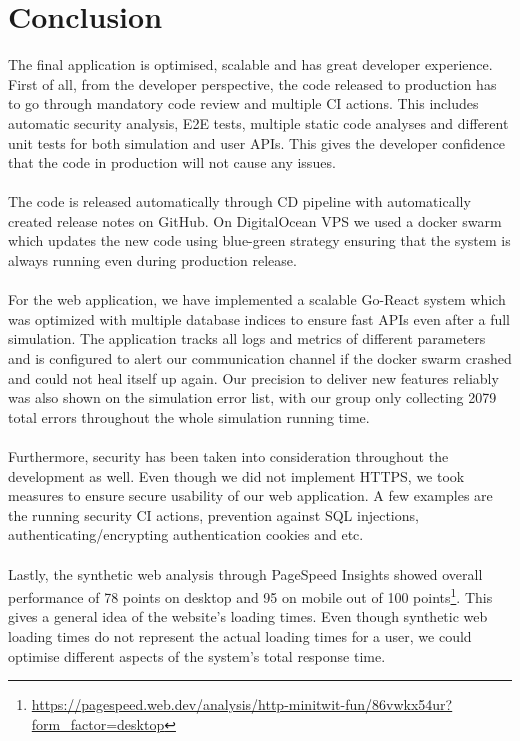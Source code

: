 \section{Conclusion}
The final application is optimised, scalable and has great developer experience. First of all, from the developer perspective, the code released to production  has to go through mandatory code review and multiple CI actions. This includes automatic security analysis, E2E tests, multiple static code analyses and different unit tests for both simulation and user APIs. This gives the developer confidence that the code in production will not cause any issues.
\\
\\
The code is released automatically through CD pipeline with automatically created release notes on GitHub. On DigitalOcean VPS we used a docker swarm which updates the new code using blue-green strategy ensuring that the system is always running even during production release.
\\
\\
For the web application, we have implemented a scalable Go-React system which was optimized with multiple database indices to ensure fast APIs even after a full simulation. The application tracks all logs and metrics of different parameters and is configured to alert our communication channel if the docker swarm crashed and could not heal itself up again. Our precision to deliver new features reliably was also shown on the simulation error list, with our group only collecting 2079 total errors throughout the whole simulation running time.
\\
\\
Furthermore, security has been taken into consideration throughout the development as well. Even though we did not implement HTTPS, we took measures to ensure secure usability of our web application. A few examples are the running security CI actions, prevention against SQL injections, authenticating/encrypting authentication cookies and etc.
\\
\\
Lastly, the synthetic web analysis through PageSpeed Insights showed overall performance of 78 points on desktop and 95 on mobile out of 100 points\footnote{\url{https://pagespeed.web.dev/analysis/http-minitwit-fun/86vwkx54ur?form_factor=desktop}}. This gives a general idea of the website's loading times. Even though synthetic web loading times do not represent the actual loading times for a user, we could optimise different aspects of the system's total response time.